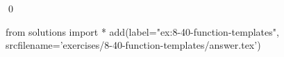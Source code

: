 
\begin{ex}
  \label{ex:8-40-function-templates}
  
  \qed
\end{ex}
\begin{python0}
from solutions import *
add(label="ex:8-40-function-templates",
    srcfilename='exercises/8-40-function-templates/answer.tex')
\end{python0}
